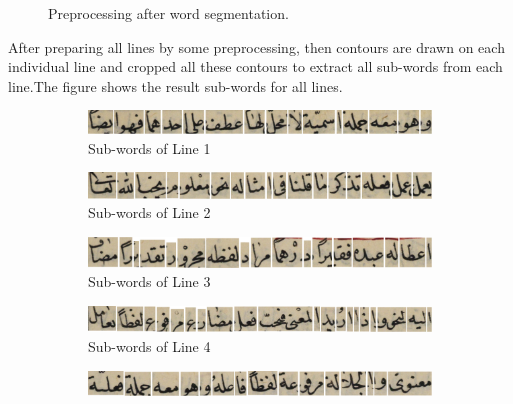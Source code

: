 \begin{figure}[H]
        \caption{Preprocessing after word segmentation.}
        \label{fig:pre-word_segmentation}
\end{figure}

After preparing all lines by some preprocessing, then contours are drawn on each individual line and cropped all these contours to extract all sub-words from each line.The figure  shows the result sub-words for all lines.
\begin{figure}[H]
     \centering%
     \begin{subfigure}[b]{0.3\textwidth}
         \centering
         \includegraphics[width=\textwidth]{images/word-seg/line-1.png}
         \caption{Sub-words of Line 1}
     \end{subfigure}
     \centering%
     \begin{subfigure}[b]{0.3\textwidth}
         \centering
         \includegraphics[width=\textwidth]{images/word-seg/line-2.png}
         \caption{Sub-words of Line 2}
     \end{subfigure}
     \centering%
     \begin{subfigure}[b]{0.3\textwidth}
         \centering
         \includegraphics[width=\textwidth]{images/word-seg/line-3.png}
         \caption{Sub-words of Line 3}
     \end{subfigure}
     \centering%
     \begin{subfigure}[b]{0.3\textwidth}
         \centering
         \includegraphics[width=\textwidth]{images/word-seg/line-4.png}
         \caption{Sub-words of Line 4}
     \end{subfigure}
     \centering%
     \begin{subfigure}[b]{0.3\textwidth}
         \centering
         \includegraphics[width=\textwidth]{images/word-seg/line-5.png}

\end{subfigure}
\end{figure}
